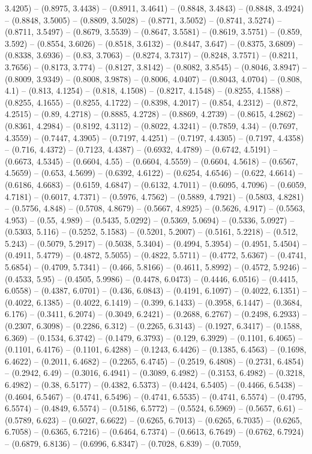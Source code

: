 3.4205) -- (0.8975, 3.4438) -- (0.8911, 3.4641) -- (0.8848, 3.4843) -- (0.8848, 3.4924) -- (0.8848, 3.5005) -- (0.8809, 3.5028) -- (0.8771, 3.5052) -- (0.8741, 3.5274) -- (0.8711, 3.5497) -- (0.8679, 3.5539) -- (0.8647, 3.5581) -- (0.8619, 3.5751) -- (0.859, 3.592) -- (0.8554, 3.6026) -- (0.8518, 3.6132) -- (0.8447, 3.647) -- (0.8375, 3.6809) -- (0.8338, 3.6936) -- (0.83, 3.7063) -- (0.8274, 3.7317) -- (0.8248, 3.7571) -- (0.8211, 3.7656) -- (0.8173, 3.774) -- (0.8127, 3.8142) -- (0.8082, 3.8545) -- (0.8046, 3.8947) -- (0.8009, 3.9349) -- (0.8008, 3.9878) -- (0.8006, 4.0407) -- (0.8043, 4.0704) -- (0.808, 4.1) -- (0.813, 4.1254) -- (0.818, 4.1508) -- (0.8217, 4.1548) -- (0.8255, 4.1588) -- (0.8255, 4.1655) -- (0.8255, 4.1722) -- (0.8398, 4.2017) -- (0.854, 4.2312) -- (0.872, 4.2515) -- (0.89, 4.2718) -- (0.8885, 4.2728) -- (0.8869, 4.2739) -- (0.8615, 4.2862) -- (0.8361, 4.2984) -- (0.8192, 4.3112) -- (0.8022, 4.3241) -- (0.7859, 4.34) -- (0.7697, 4.3559) -- (0.7447, 4.3905) -- (0.7197, 4.4251) -- (0.7197, 4.4305) -- (0.7197, 4.4358) -- (0.716, 4.4372) -- (0.7123, 4.4387) -- (0.6932, 4.4789) -- (0.6742, 4.5191) -- (0.6673, 4.5345) -- (0.6604, 4.55) -- (0.6604, 4.5559) -- (0.6604, 4.5618) -- (0.6567, 4.5659) -- (0.653, 4.5699) -- (0.6392, 4.6122) -- (0.6254, 4.6546) -- (0.622, 4.6614) -- (0.6186, 4.6683) -- (0.6159, 4.6847) -- (0.6132, 4.7011) -- (0.6095, 4.7096) -- (0.6059, 4.7181) -- (0.6017, 4.7371) -- (0.5976, 4.7562) -- (0.5889, 4.7921) -- (0.5803, 4.8281) -- (0.5756, 4.848) -- (0.5708, 4.8679) -- (0.5667, 4.8925) -- (0.5626, 4.917) -- (0.5563, 4.953) -- (0.55, 4.989) -- (0.5435, 5.0292) -- (0.5369, 5.0694) -- (0.5336, 5.0927) -- (0.5303, 5.116) -- (0.5252, 5.1583) -- (0.5201, 5.2007) -- (0.5161, 5.2218) -- (0.512, 5.243) -- (0.5079, 5.2917) -- (0.5038, 5.3404) -- (0.4994, 5.3954) -- (0.4951, 5.4504) -- (0.4911, 5.4779) -- (0.4872, 5.5055) -- (0.4822, 5.5711) -- (0.4772, 5.6367) -- (0.4741, 5.6854) -- (0.4709, 5.7341) -- (0.466, 5.8166) -- (0.4611, 5.8992) -- (0.4572, 5.9246) -- (0.4533, 5.95) -- (0.4505, 5.9986) -- (0.4478, 6.0473) -- (0.4446, 6.0516) -- (0.4415, 6.0558) -- (0.4387, 6.0701) -- (0.436, 6.0843) -- (0.4191, 6.1097) -- (0.4022, 6.1351) -- (0.4022, 6.1385) -- (0.4022, 6.1419) -- (0.399, 6.1433) -- (0.3958, 6.1447) -- (0.3684, 6.176) -- (0.3411, 6.2074) -- (0.3049, 6.2421) -- (0.2688, 6.2767) -- (0.2498, 6.2933) -- (0.2307, 6.3098) -- (0.2286, 6.312) -- (0.2265, 6.3143) -- (0.1927, 6.3417) -- (0.1588, 6.369) -- (0.1534, 6.3742) -- (0.1479, 6.3793) -- (0.129, 6.3929) -- (0.1101, 6.4065) -- (0.1101, 6.4176) -- (0.1101, 6.4288) -- (0.1243, 6.4426) -- (0.1385, 6.4563) -- (0.1698, 6.4622) -- (0.2011, 6.4682) -- (0.2265, 6.4745) -- (0.2519, 6.4808) -- (0.2731, 6.4854) -- (0.2942, 6.49) -- (0.3016, 6.4941) -- (0.3089, 6.4982) -- (0.3153, 6.4982) -- (0.3218, 6.4982) -- (0.38, 6.5177) -- (0.4382, 6.5373) -- (0.4424, 6.5405) -- (0.4466, 6.5438) -- (0.4604, 6.5467) -- (0.4741, 6.5496) -- (0.4741, 6.5535) -- (0.4741, 6.5574) -- (0.4795, 6.5574) -- (0.4849, 6.5574) -- (0.5186, 6.5772) -- (0.5524, 6.5969) -- (0.5657, 6.61) -- (0.5789, 6.623) -- (0.6027, 6.6622) -- (0.6265, 6.7013) -- (0.6265, 6.7035) -- (0.6265, 6.7058) -- (0.6365, 6.7216) -- (0.6464, 6.7374) -- (0.6613, 6.7649) -- (0.6762, 6.7924) -- (0.6879, 6.8136) -- (0.6996, 6.8347) -- (0.7028, 6.839) -- (0.7059, 